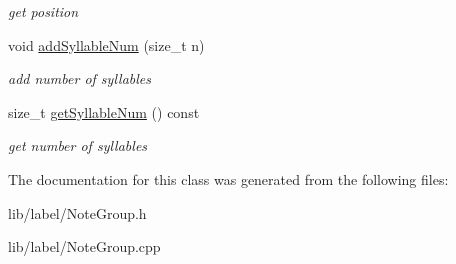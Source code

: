 \begin{DoxyCompactItemize}
\begin{DoxyCompactList}\small\item\em get position \end{DoxyCompactList}\item 
\hypertarget{classsinsy_1_1NoteGroup_a9e78ddbac0ff1fd8cadf5c947cdba98c}{void \hyperlink{classsinsy_1_1NoteGroup_a9e78ddbac0ff1fd8cadf5c947cdba98c}{add\-Syllable\-Num} (size\-\_\-t n)}\label{classsinsy_1_1NoteGroup_a9e78ddbac0ff1fd8cadf5c947cdba98c}

\begin{DoxyCompactList}\small\item\em add number of syllables \end{DoxyCompactList}\item 
\hypertarget{classsinsy_1_1NoteGroup_a839d4263d13d7afeb23dca7d5c748b59}{size\-\_\-t \hyperlink{classsinsy_1_1NoteGroup_a839d4263d13d7afeb23dca7d5c748b59}{get\-Syllable\-Num} () const }\label{classsinsy_1_1NoteGroup_a839d4263d13d7afeb23dca7d5c748b59}

\begin{DoxyCompactList}\small\item\em get number of syllables \end{DoxyCompactList}\end{DoxyCompactItemize}


\-The documentation for this class was generated from the following files\-:\begin{DoxyCompactItemize}
\item 
lib/label/\-Note\-Group.\-h\item 
lib/label/\-Note\-Group.\-cpp\end{DoxyCompactItemize}
